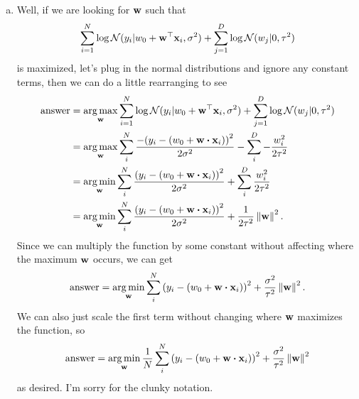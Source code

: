 \documentclass[12pt,letterpaper]{hmcpset}
\begin{document}
\begin{solution}
		\begin{enumerate}[(a)]
		\item Well, if we are looking for $\vb w$ such that \[\sum_{i=1}^N \log{\cal N}(y_i | w_0 + {\bf w}^\top{\bf x}_i, \sigma^2) + \sum_{j=1}^D \log{\cal N}(w_j | 0, \tau^2)\] is maximized, let's plug in the normal distributions and ignore any constant terms, then we can do a little rearranging to see 
		\begin{align*}
			{\rm answer} &=\argmax_\ww \sum_{i=1}^N \log\Nc(y_i | w_0 + \ww^\T\xx_i, \sigma^2) + \sum_{j=1}^D \log\Nc(w_j | 0, \tau^2) \\ &= 
			\argmax_\ww \sum_i^N \frac{-\qty(y_i - (w_0 + \ww \vdot \xx_i))^2}{2\sigma^2} - \sum_i^D - \frac{w_i^2}{2\tau^2} \\
			&= \argmin_\ww \sum_i^N \frac{\qty(y_i - (w_0 + \ww \vdot \xx_i))^2}{2\sigma^2} + \sum_i^D \frac{w_i^2}{2\tau^2} \\
			&= \argmin_\ww \sum_i^N \frac{\qty(y_i - (w_0 + \ww \vdot \xx_i))^2}{2\sigma^2} + \frac{1}{2\tau^2} \norm{\ww}^2.
		\end{align*}
		Since we can multiply the function by some constant without affecting where the maximum ${\bf w}$ occurs, we can get
		\begin{align*}
			{\rm answer}= \argmin_\ww \sum_i^N \qty(y_i - (w_0 + \ww \vdot \xx_i))^2 + \frac{\sigma^2}{\tau^2} \norm{\ww}^2.
		\end{align*}
		We can also just scale the first term without changing where ${\bf w}$ maximizes the function, so
		\begin{align*}
			{\rm answer} = \argmin_\ww \frac1N\sum_i^N \qty(y_i - (w_0 + \ww \vdot \xx_i))^2 + \frac{\sigma^2}{\tau^2} \norm{\ww}^2
		\end{align*}
		as desired. I'm sorry for the clunky notation.



\end{enumerate}
\end{solution}
\end{document}
